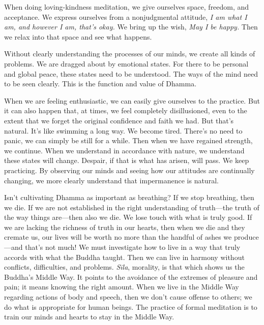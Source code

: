 When doing loving-kindness meditation, we give ourselves space, 
freedom, and acceptance. We express ourselves from a nonjudgmental 
attitude, \emph{I am what I am, and however I am, that's okay.} We 
bring up the wish, \emph{May I be happy.} Then we relax into that space 
and see what happens.


Without clearly understanding the processes of our minds, we create all 
kinds of problems. We are dragged about by emotional states. For there 
to be personal and global peace, these states need to be understood. 
The ways of the mind need to be seen clearly. This is the function and 
value of Dhamma.

When we are feeling enthusiastic, we can easily give ourselves to the 
practice. But it can also happen that, at times, we feel completely 
disillusioned, even to the extent that we forget the original 
confidence and faith we had. But that's natural. It's like swimming a 
long way. We become tired. There's no need to panic, we can simply be 
still for a while. Then when we have regained strength, we continue. 
When we understand in accordance with nature, we understand these 
states will change. Despair, if that is what has arisen, will pass. We 
keep practicing. By observing our minds and seeing how our attitudes 
are continually changing, we more clearly understand that impermanence 
is natural.

Isn't cultivating Dhamma as important as breathing? If we stop 
breathing, then we die. If we are not established in the right 
understanding of truth---the truth of the way things are---then also we 
die. We lose touch with what is truly good. If we are lacking the 
richness of truth in our hearts, then when we die and they cremate us, 
our lives will be worth no more than the handful of ashes we 
produce---and that's not much! We must investigate how to live in a way 
that truly accords with what the Buddha taught. Then we can live in 
harmony without conflicts, difficulties, and problems. \emph{Sīla}, 
morality, is that which shows us the Buddha's Middle Way. It points to 
the avoidance of the extremes of pleasure and pain; it means knowing 
the right amount. When we live in the Middle Way regarding actions of 
body and speech, then we don't cause offense to others; we do what is 
appropriate for human beings. The practice of formal meditation is to 
train our minds and hearts to stay in the Middle Way.

